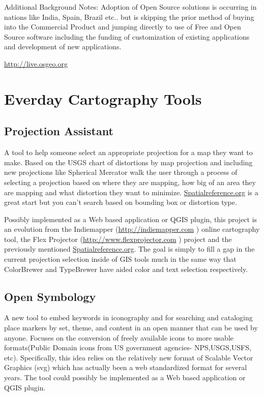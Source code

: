 \documentclass[12pt,letterpaper]{article}
\begin{document}
Additional Background Notes: Adoption of Open Source solutions is occurring in nations like India, Spain, Brazil etc.. but is skipping the prior method of buying into the Commercial Product and jumping directly to use of Free and Open Source software including the funding of customization of existing applications and development of new applications.

\url{http://live.osgeo.org}


\section{Everday Cartography Tools}

\subsection{Projection Assistant}
A tool to help someone select an appropriate projection for a map they want to make. Based on the USGS chart of distortions by map projection and including new projections like Spherical Mercator walk the user through a process of selecting a projection based on where they are mapping, how big of an area they are mapping and what distortion they want to minimize. \href{http://Spatialreference.org}{Spatialreference.org} is a great start but you can't search based on bounding box or distortion type.

Possibly implemented as a Web based application or QGIS plugin, this project is an evolution from the Indiemapper (\url{http://indiemapper.com} ) online cartography tool, the Flex Projector (\url{http://www.flexprojector.com} ) project and the previously mentioned \href{http://Spatialreference.org}{Spatialreference.org}. The goal is simply to fill a gap in the current projection selection inside of GIS tools much in the same way that ColorBrewer and TypeBrewer have aided color and text selection respectively. 


\subsection{Open Symbology}
A new tool to embed keywords in iconography and for searching and cataloging place markers by set, theme,  and content in an open manner that can be used by anyone. Focuses on the conversion of freely available icons to more usable formats(Public Domain icons from US government agencies- NPS,USGS,USFS, etc). Specifically, this idea relies on the relatively new format of Scalable Vector Graphics (svg) which has actually been a web standardized format for several years. The tool could possibly be implemented as a Web based application or QGIS plugin.
\end{document}

